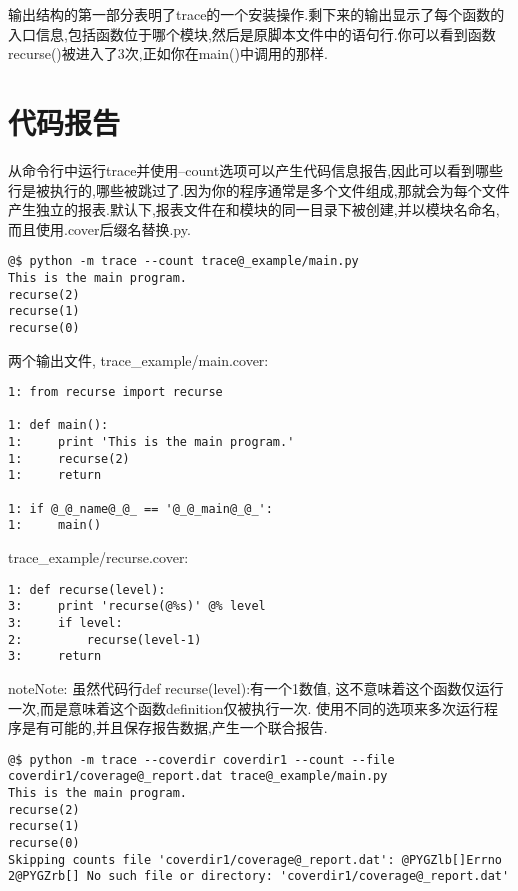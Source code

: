 \documentclass[a4paper,10pt,english]{manual}
\begin{document}
输出结构的第一部分表明了trace的一个安装操作.剩下来的输出显示了每个函数的入口信息,包括函数位于哪个模块,然后是原脚本文件中的语句行.你可以看到函数recurse()被进入了3次,正如你在main()中调用的那样.


\section{代码报告}

从命令行中运行trace并使用--count选项可以产生代码信息报告,因此可以看到哪些行是被执行的,哪些被跳过了.因为你的程序通常是多个文件组成,那就会为每个文件产生独立的报表.默认下,报表文件在和模块的同一目录下被创建,并以模块名命名,而且使用.cover后缀名替换.py.

\begin{Verbatim}[commandchars=@\[\]]
@$ python -m trace --count trace@_example/main.py
This is the main program.
recurse(2)
recurse(1)
recurse(0)
\end{Verbatim}

两个输出文件, trace\_example/main.cover:

\begin{Verbatim}[commandchars=@\[\]]
1: from recurse import recurse

1: def main():
1:     print 'This is the main program.'
1:     recurse(2)
1:     return

1: if @_@_name@_@_ == '@_@_main@_@_':
1:     main()
\end{Verbatim}

trace\_example/recurse.cover:

\begin{Verbatim}[commandchars=@\[\]]
1: def recurse(level):
3:     print 'recurse(@%s)' @% level
3:     if level:
2:         recurse(level-1)
3:     return
\end{Verbatim}

\begin{notice}{note}{Note:}
虽然代码行def recurse(level):有一个1数值, 这不意味着这个函数仅运行一次,而是意味着这个函数definition仅被执行一次.
使用不同的选项来多次运行程序是有可能的,并且保存报告数据,产生一个联合报告.
\end{notice}

\begin{Verbatim}[commandchars=@\[\]]
@$ python -m trace --coverdir coverdir1 --count --file coverdir1/coverage@_report.dat trace@_example/main.py
This is the main program.
recurse(2)
recurse(1)
recurse(0)
Skipping counts file 'coverdir1/coverage@_report.dat': @PYGZlb[]Errno 2@PYGZrb[] No such file or directory: 'coverdir1/coverage@_report.dat'
\end{Verbatim}
\end{document}
